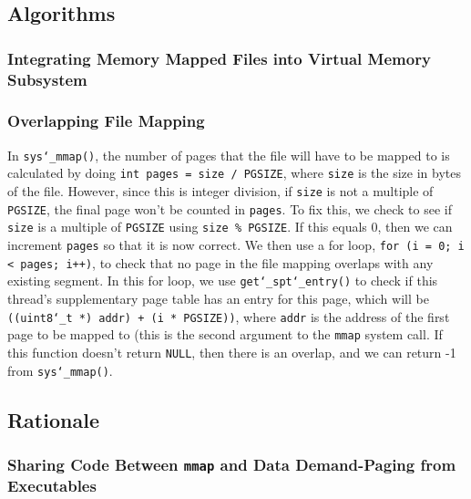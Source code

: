 \documentclass{article}
\renewcommand{\_}{\char`_}
\begin{document}
\subsection{Algorithms}

\subsubsection{Integrating Memory Mapped Files into Virtual Memory Subsystem}

\subsubsection{Overlapping File Mapping}

In \texttt{sys\_mmap()}, the number of pages that the file will have to be mapped to is calculated by doing \texttt{int pages = size / PGSIZE}, where \texttt{size} is the size in bytes of the file. However, since this is integer division, if \texttt{size} is not a multiple of \texttt{PGSIZE}, the final page won't be counted in \texttt{pages}. To fix this, we check to see if \texttt{size} is a multiple of \texttt{PGSIZE} using \texttt{size \% PGSIZE}. If this equals 0, then we can increment \texttt{pages} so that it is now correct. We then use a for loop, \texttt{for (i = 0; i < pages; i++)}, to check that no page in the file mapping overlaps with any existing segment. In this for loop, we use \texttt{get\_spt\_entry()} to check if this thread's supplementary page table has an entry for this page, which will be \texttt{((uint8\_t *) addr) + (i * PGSIZE))}, where \texttt{addr} is the address of the first page to be mapped to (this is the second argument to the \texttt{mmap} system call. If this function doesn't return \texttt{NULL}, then there is an overlap, and we can return -1 from \texttt{sys\_mmap()}.

\subsection{Rationale}

\subsubsection{Sharing Code Between \texttt{mmap} and Data Demand-Paging from Executables}
\end{document}
